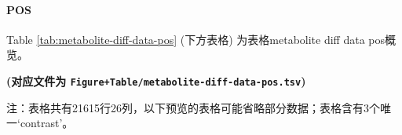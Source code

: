 \documentclass[
]{article}
\begin{document}
\hypertarget{pos-1}{%
\paragraph{POS}\label{pos-1}}

Table \ref{tab:metabolite-diff-data-pos} (下方表格) 为表格metabolite diff data pos概览。

\textbf{(对应文件为 \texttt{Figure+Table/metabolite-diff-data-pos.tsv})}

\begin{center}\begin{tcolorbox}[colback=gray!10, colframe=gray!50, width=0.9\linewidth, arc=1mm, boxrule=0.5pt]注：表格共有21615行26列，以下预览的表格可能省略部分数据；表格含有3个唯一`contrast'。
\end{tcolorbox}
\end{center}
\end{document}

